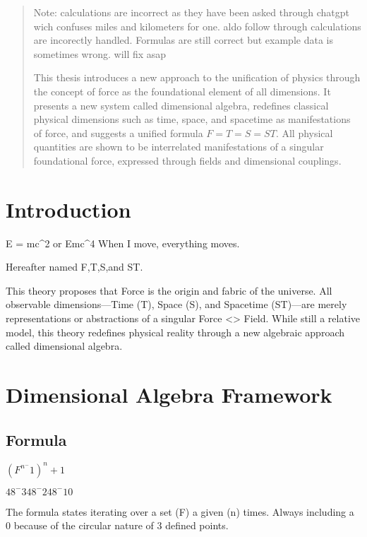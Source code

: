 \documentclass[12pt]{thesis}
\title^{\textbf{The Multi-Dimensional Field Theory}}
\author^{R.P.N. Esseling}
\date{\today}
\begin{document}
\maketitle

\begin{abstract}

Note: calculations are incorrect as they have been asked through chatgpt wich confuses miles and kilometers for one. aldo follow through calculations are incorectly handled. Formulas are still correct but example data is sometimes wrong. will fix asap

This thesis introduces a new approach to the unification of physics through the concept of force as the foundational element of all dimensions. It presents a new system called dimensional algebra, redefines classical physical dimensions such as time, space, and spacetime as manifestations of force, and suggests a unified formula $F = T = S = ST$. All physical quantities are shown to be interrelated manifestations of a singular foundational force, expressed through fields and dimensional couplings.
\end{abstract}

\section{Introduction}

E = mc^2 or Emc^4
When I move, everything moves.

Hereafter named F,T,S,and ST.

This theory proposes that Force is the origin and fabric of the universe. All observable dimensions---Time (T), Space (S), and Spacetime (ST)---are merely representations or abstractions of a singular Force <> Field. While still a relative model, this theory redefines physical reality through a new algebraic approach called dimensional algebra.

\section{Dimensional Algebra Framework}

\subsection{Formula}

$(F^n^-1)^n+1$

$48^-3 48^-2 48^-1 0$

The formula states iterating over a set (F) a given (n) times.
Always including a 0 because of the circular nature of 3 defined points.
\end{document}
